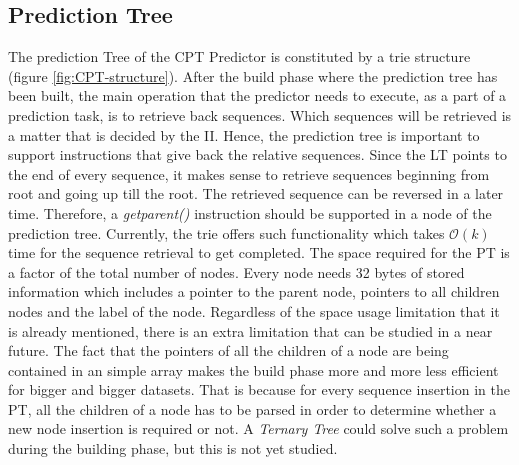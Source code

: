 \subsection{Prediction Tree}
The prediction Tree of the CPT Predictor is constituted by a trie structure (figure \ref{fig:CPT-structure}). After the build phase where the prediction tree has been built, the main operation that the predictor needs to execute, as a part of a prediction task, is to retrieve back sequences. Which sequences will be retrieved is a matter that is decided by the II. Hence, the prediction tree is important to support instructions that give back the relative sequences. Since the LT points to the end of every sequence, it makes sense to retrieve sequences beginning from root and going up till the root. The retrieved sequence can be reversed in a later time. Therefore, a \emph{getparent()} instruction should be supported in a node of the prediction tree. Currently, the trie offers such functionality which takes \(\mathcal{O}(k)\) time for the sequence retrieval to get completed. The space required for the PT is a factor of the total number of nodes. Every node needs 32 bytes of stored information which includes a pointer to the parent node, pointers to all children nodes and the label of the node. Regardless of the space usage limitation that it is already mentioned, there is an extra limitation that can be studied in a near future. The fact that the pointers of all the children of a node are being contained in an simple array makes the build phase more and more less efficient for bigger and bigger datasets. That is because for every sequence insertion in the PT, all the children of a node has to be parsed in order to determine whether a new node insertion is required or not. A \emph{Ternary Tree} \cite{bentley_fast_1997} could solve such a problem during the building phase, but this is not yet studied.
